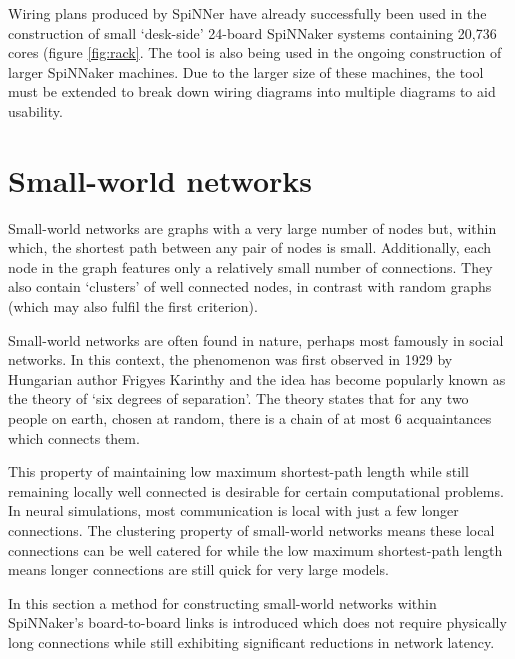 			Wiring plans produced by SpiNNer have already successfully been used in
			the construction of small `desk-side' 24-board SpiNNaker systems
			containing 20,736 cores (figure \ref{fig:rack}. The tool is also being
			used in the ongoing construction of larger SpiNNaker machines. Due to the
			larger size of these machines, the tool must be extended to break down
			wiring diagrams into multiple diagrams to aid usability.
	
	
	\section{Small-world networks}
		
		
		Small-world networks are graphs with a very large number of nodes but,
		within which, the shortest path between any pair of nodes is small.
		Additionally, each node in the graph features only a relatively small number
		of connections. They also contain `clusters' of well connected nodes, in
		contrast with random graphs (which may also fulfil the first criterion).
		
		Small-world networks are often found in nature, perhaps most famously in
		social networks. In this context, the phenomenon was first observed in 1929
		by Hungarian author Frigyes Karinthy \cite{karinthy29} and the idea has
		become popularly known as the theory of `six degrees of separation'. The
		theory states that for any two people on earth, chosen at random, there is a
		chain of at most 6 acquaintances which connects them.
		
		This property of maintaining low maximum shortest-path length while still
		remaining locally well connected is desirable for certain computational
		problems. In neural simulations, most communication is local with just a few
		longer connections. The clustering property of small-world networks means
		these local connections can be well catered for while the low maximum
		shortest-path length means longer connections are still quick for very large
		models.
		
		In this section a method for constructing small-world networks within
		SpiNNaker's board-to-board links is introduced which does not require
		physically long connections while still exhibiting significant reductions in
		network latency.
		
